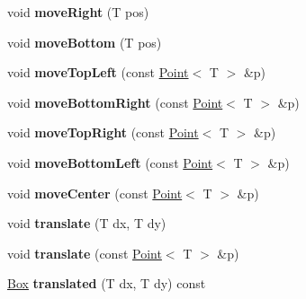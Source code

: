\begin{DoxyCompactItemize}
\item 
\hypertarget{class_box_a224e6b7f6da28d3e72d8abac92d0559f}{
void {\bfseries moveRight} (T pos)}
\label{class_box_a224e6b7f6da28d3e72d8abac92d0559f}

\item 
\hypertarget{class_box_a5a5a2ff82018b2b385ed3ad222b081e4}{
void {\bfseries moveBottom} (T pos)}
\label{class_box_a5a5a2ff82018b2b385ed3ad222b081e4}

\item 
\hypertarget{class_box_a25f13cb4c83114b15caa2d62675137bb}{
void {\bfseries moveTopLeft} (const \hyperlink{class_point}{Point}$<$ T $>$ \&p)}
\label{class_box_a25f13cb4c83114b15caa2d62675137bb}

\item 
\hypertarget{class_box_ae5103f2b496ac2f10105c41a336ec088}{
void {\bfseries moveBottomRight} (const \hyperlink{class_point}{Point}$<$ T $>$ \&p)}
\label{class_box_ae5103f2b496ac2f10105c41a336ec088}

\item 
\hypertarget{class_box_a13e447ff3e86e55f6cd66cd74a0d0c7a}{
void {\bfseries moveTopRight} (const \hyperlink{class_point}{Point}$<$ T $>$ \&p)}
\label{class_box_a13e447ff3e86e55f6cd66cd74a0d0c7a}

\item 
\hypertarget{class_box_a365ae8132302f9675d7d962fb7a8faec}{
void {\bfseries moveBottomLeft} (const \hyperlink{class_point}{Point}$<$ T $>$ \&p)}
\label{class_box_a365ae8132302f9675d7d962fb7a8faec}

\item 
\hypertarget{class_box_a62d7d531ad38076276749bcfc20285d2}{
void {\bfseries moveCenter} (const \hyperlink{class_point}{Point}$<$ T $>$ \&p)}
\label{class_box_a62d7d531ad38076276749bcfc20285d2}

\item 
\hypertarget{class_box_a2c3adee7df1462f3bfa5ae4870148505}{
void {\bfseries translate} (T dx, T dy)}
\label{class_box_a2c3adee7df1462f3bfa5ae4870148505}

\item 
\hypertarget{class_box_a077d6debae34fe86b701d7b2f8898c80}{
void {\bfseries translate} (const \hyperlink{class_point}{Point}$<$ T $>$ \&p)}
\label{class_box_a077d6debae34fe86b701d7b2f8898c80}

\item 
\hypertarget{class_box_a435e394b453a84f5c82f4163652dfb50}{
\hyperlink{class_box}{Box} {\bfseries translated} (T dx, T dy) const }
\label{class_box_a435e394b453a84f5c82f4163652dfb50}


\end{DoxyCompactItemize}
